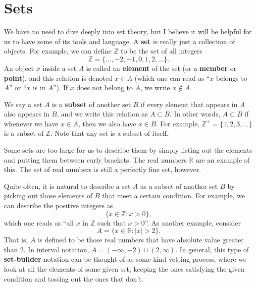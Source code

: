 \documentclass{article}
\begin{document}



\section{Sets}

We have no need to dive deeply into set theory, but I believe it will be helpful for us to have some of its tools and language. 
A \textbf{set} is really just a collection of objects. For example,
we can define $\mathbb{Z}$ to be the set of all integers
\[\mathbb{Z}=\{\ldots,-2,-1,0,1,2,\ldots\}.\]
An object $x$ inside a set $A$ is called an \textbf{element} of the set (or a \textbf{member} or \textbf{point}), and this relation is denoted $x \in A$ (which one can read as ``$x$ belongs to $A$'' or ``$x$ is in $A$'').
If $x$ does not belong to $A$, we write $x \notin A$.

We say a set $A$ is a \textbf{subset} of another set $B$ if every element that appears in $A$ also appears in $B$, and we write this relation as 
$A \subset B$. In other words, $A \subset B$ if whenever we have $x \in A$, then we also have $x \in B$.
For example, $\mathbb{Z}^+ = \{1,2,3,\ldots\}$ is a subset of $\mathbb{Z}$. Note that any set is a subset of itself.

Some sets are too large for us to describe them by simply listing out the elements and putting them between curly brackets. The real numbers $\mathbb{R}$ are an example of this.
The set of real numbers is still a perfectly fine set, however.  

Quite often, it is natural to describe a set $A$ as a subset of another set $B$ by picking out those elements of $B$ that meet a certain condition.
For example, we can describe the positive integers as 
\[ \{ x \in \mathbb{Z} : x > 0\}, \]
which one reads as ``all $x$ in $\mathbb{Z}$ such that $x > 0$''.
As another example, consider
\[ A = \{ x \in \mathbb{R} : |x| > 2\}.\]
That is, $A$ is defined to be those real numbers that have absolute value greater than $2$. In interval notation, $A = (-\infty, -2) \cup (2, \infty)$.
In general, this type of \textbf{set-builder} notation can be thought of as some kind vetting process, where we look at all the elements of some
given set, keeping the ones satisfying the given condition and tossing out the ones that don't.
\end{document}

